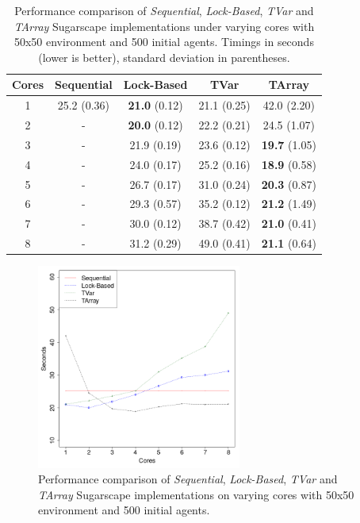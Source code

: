 \begin{table}
	\centering
  	\begin{tabular}{ c || c | c | c | c }
        Cores  & Sequential  & Lock-Based            & TVar         & TArray                \\ \hline \hline 
    		1      & 25.2 (0.36) & \textbf{21.0} (0.12)  & 21.1 (0.25)  & 42.0 (2.20)           \\ \hline
   		2      & -           & \textbf{20.0} (0.12)  & 22.2 (0.21)  & 24.5 (1.07)           \\ \hline
   		3      & -           & 21.9 (0.19)           & 23.6 (0.12)  & \textbf{19.7} (1.05)  \\ \hline
   		4      & -           & 24.0 (0.17)           & 25.2 (0.16)  & \textbf{18.9} (0.58)  \\ \hline
   		5      & -           & 26.7 (0.17)           & 31.0 (0.24)  & \textbf{20.3} (0.87)  \\ \hline
   		6      & -           & 29.3 (0.57)           & 35.2 (0.12)  & \textbf{21.2} (1.49)  \\ \hline
   		7      & -           & 30.0 (0.12)           & 38.7 (0.42)  & \textbf{21.0} (0.41)  \\ \hline
   		8      & -           & 31.2 (0.29)           & 49.0 (0.41)  & \textbf{21.1} (0.64)  \\ \hline \hline
   	\end{tabular}
 
  	\caption{Performance comparison of \textit{Sequential}, \textit{Lock-Based}, \textit{TVar} and \textit{TArray} Sugarscape implementations under varying cores with 50x50 environment and 500 initial agents. Timings in seconds (lower is better), standard deviation in parentheses.}
	\label{tab:sugarscape_varyingcores_constagents}
\end{table}

\begin{figure}
	\centering
	\includegraphics[width=0.6\textwidth, angle=0]{./fig/concurrentabs/sugarscape/sugarscape_varyingcores_constagents.png}
	\caption{Performance comparison of \textit{Sequential}, \textit{Lock-Based}, \textit{TVar} and \textit{TArray} Sugarscape implementations on varying cores with 50x50 environment and 500 initial agents.}
	\label{fig:sugarscape_varyingcores_constagents}
\end{figure}

